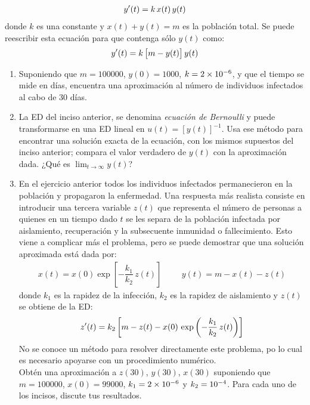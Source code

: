 \begin{enumerate}
\begin{align*}
{y}^{\prime} (t) = k \, x (t) \, y (t)
\end{align*}
donde $k$ es una constante y $x (t) + y (t) = m$ es la población total. Se puede reescribir esta ecuación para que contenga sólo $y (t)$ como:
\begin{align*}
{y}^{\prime} (t) = k \, \big[ m - y (t) \big] \, y(t)
\end{align*}
\begin{enumerate}
\item Suponiendo que $m = 100000$, $y (0) = 1000$, $k = \num{2d-6}$, y que el tiempo se mide en días, encuentra una aproximación al número de individuos infectados al cabo de $30$ días.
\item La ED del inciso anterior, se denomina \emph{ecuación de Bernoulli} y puede transformarse en una ED lineal en $u (t) = [ y (t) ]^{-1}$. Usa ese método para encontrar una solución exacta de la ecuación, con los mismos supuestos del inciso anterior; compara el valor verdadero de $y (t)$ con la aproximación dada. ¿Qué es $\displaystyle\lim_{t \rightarrow \infty} y(t)$?
\item En el ejercicio anterior todos los individuos infectados permanecieron en la población y propagaron la enfermedad. Una respuesta más realista consiste en introducir una tercera variable $z (t)$ que representa el número de personas a quienes en un tiempo dado $t$ se les separa de la población infectada por aislamiento, recuperación y la subsecuente inmunidad o fallecimiento. Esto viene a complicar más el problema, pero se puede demostrar que una solución aproximada está dada por:
\begin{align*}
x (t) = x (0) \exp\left[- \dfrac{k_{1}}{k_{2}} \, z(t) \right] \hspace{1cm} y (t) = m - x (t) - z (t)
\end{align*}
donde $k_{1}$ es la rapidez de la infección, $k_{2}$ es la rapidez de aislamiento y $z (t)$ se obtiene de la ED:
\begin{align*}
{z}^{\prime} (t) = k_{2} \left[ m - z (t) - x(0) \, \exp \left( - \dfrac{k_{1}}{k_{2}} \, z (t) \right) \right]
\end{align*}
No se conoce un método para resolver directamente este problema, po lo cual es necesario apoyarse con un procedimiento numérico.
\\
Obtén una aproximación a $z (30)$, $y (30)$, $x (30)$ suponiendo que \break \hfill $m = 100000$, $x (0) = 99000$, $k_{1} = \num{2d-6}$ y $k_{2} = \num{d-4}$. Para cada uno de los incisos, discute tus resultados.

\end{enumerate}
\end{enumerate}
